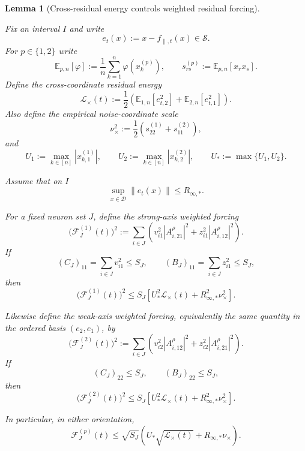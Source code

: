 \documentclass{article} %
\theoremstyle{plain}
\newtheorem{lemma}[theorem]{Lemma}
\theoremstyle{definition}
\theoremstyle{remark}
\begin{document}
\begin{lemma}[Cross-residual energy controls weighted residual forcing]
\label{sbagg:lem:cross-residual-controls-forcing}

Fix an interval $I$ and write
\[
e_t(x)
:=
x-f_{\parallel,t}(x)
\in\mathcal S.
\]
For $p\in\{1,2\}$ write
\[
\mathbb E_{p,n}[\varphi]
:=
\frac1n\sum_{k=1}^n\varphi(x_k^{(p)}),
\qquad
s_{rs}^{(p)}
:=
\mathbb E_{p,n}[x_rx_s].
\]
Define the cross-coordinate residual energy
\[
\boxed{
\mathcal L_\times(t)
:=
\frac12
\left(
\mathbb E_{1,n}[e_{t,2}^2]
+
\mathbb E_{2,n}[e_{t,1}^2]
\right).
}
\]
Also define the empirical noise-coordinate scale
\[
\boxed{
\nu_\times^2
:=
\frac12
\left(
s_{22}^{(1)}
+
s_{11}^{(2)}
\right),
}
\]
and
\[
U_1:=\max_{k\in[n]}|x_{k,1}^{(1)}|,
\qquad
U_2:=\max_{k\in[n]}|x_{k,2}^{(2)}|,
\qquad
U_*:=\max\{U_1,U_2\}.
\]

Assume that on $I$
\[
\sup_{x\in\mathcal D}\|e_t(x)\|
\le R_{\infty,*}.
\]

For a fixed neuron set $J$, define the strong-axis weighted forcing
\[
\boxed{
\bigl(\mathcal F_J^{(1)}(t)\bigr)^2
:=
\sum_{i\in J}
\left(
v_{i1}^2|A_{i,21}^\rho|^2
+
z_{i1}^2|A_{i,12}^\rho|^2
\right).
}
\]
If
\[
(C_J)_{11}
=
\sum_{i\in J}v_{i1}^2
\le S_J,
\qquad
(B_J)_{11}
=
\sum_{i\in J}z_{i1}^2
\le S_J,
\]
then
\[
\boxed{
\bigl(\mathcal F_J^{(1)}(t)\bigr)^2
\le
S_J
\left[
U_*^2\mathcal L_\times(t)
+
R_{\infty,*}^2\nu_\times^2
\right].
}
\tag{cross-forcing-1}
\label{sbagg:eq:cross-forcing-1}
\]

Likewise define the weak-axis weighted forcing, equivalently the same
quantity in the ordered basis $(e_2,e_1)$, by
\[
\boxed{
\bigl(\mathcal F_J^{(2)}(t)\bigr)^2
:=
\sum_{i\in J}
\left(
v_{i2}^2|A_{i,12}^\rho|^2
+
z_{i2}^2|A_{i,21}^\rho|^2
\right).
}
\]
If
\[
(C_J)_{22}\le S_J,
\qquad
(B_J)_{22}\le S_J,
\]
then
\[
\boxed{
\bigl(\mathcal F_J^{(2)}(t)\bigr)^2
\le
S_J
\left[
U_*^2\mathcal L_\times(t)
+
R_{\infty,*}^2\nu_\times^2
\right].
}
\tag{cross-forcing-2}
\label{sbagg:eq:cross-forcing-2}
\]

In particular, in either orientation,
\[
\boxed{
\mathcal F_J^{(p)}(t)
\le
\sqrt{S_J}
\left(
U_*\sqrt{\mathcal L_\times(t)}
+
R_{\infty,*}\nu_\times
\right).
}
\tag{cross-forcing-root}
\label{sbagg:eq:cross-forcing-root}
\]
\end{lemma}
\end{document}
